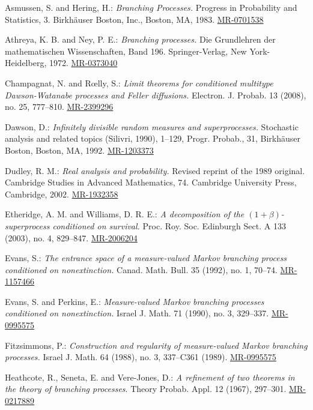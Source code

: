 \documentclass[12pt,a4paper]{amsart}
\numberwithin{equation}{section}
\theoremstyle{plain}
\theoremstyle{definition}
\theoremstyle{remark}
\def\MR#1{\href{http://www.ams.org/mathscinet-getitem?mr=#1}{MR-#1}}
\begin{document}
\begin{thebibliography}{99}

	Asmussen, S. and Hering, H.:
	\emph{Branching Processes.}
	Progress in Probability and Statistics, 3. Birkh\"auser Boston, Inc., Boston, MA, 1983.
	\MR{0701538}

	Athreya, K. B. and Ney, P. E.:
	\emph{Branching processes.}
	Die Grundlehren der mathematischen Wissenschaften, Band 196. Springer-Verlag, New York-Heidelberg, 1972.
	\MR{0373040}
	
	Champagnat, N. and R{\oe}lly, S.:
	\emph{Limit theorems for conditioned multitype Dawson-Watanabe processes and Feller diffusions.}
	Electron. J. Probab. 13 (2008), no. 25, 777--810.
	\MR{2399296}

	Dawson, D.:
	\emph{Infinitely divisible random measures and superprocesses.}
	Stochastic analysis and related topics (Silivri, 1990), 1--129, Progr. Probab., 31, Birkh\"auser Boston, Boston, MA, 1992.
	\MR{1203373}
	
	Dudley, R. M.:
	\emph{Real analysis and probability.}
	Revised reprint of the 1989 original. Cambridge Studies in Advanced Mathematics, 74. Cambridge University Press, Cambridge, 2002.
	\MR{1932358}
	
	Etheridge, A. M. and Williams, D. R. E.:
	\emph{A decomposition of the $(1+\beta)$-superprocess conditioned on survival.}
	Proc. Roy. Soc. Edinburgh Sect. A 133 (2003), no. 4, 829--847.
	\MR{2006204}
	
	Evans, S.:
	\emph{The entrance space of a measure-valued Markov branching process conditioned on nonextinction.}
	Canad. Math. Bull. 35 (1992), no. 1, 70--74.
	\MR{1157466} 
	
	Evans, S. and Perkins, E.:
	\emph{Measure-valued Markov branching processes conditioned on nonextinction.}
	Israel J. Math. 71 (1990), no. 3,
	329--337.
	\MR{0995575}
	
	Fitzsimmons, P.:
	\emph{Construction and regularity of measure-valued Markov branching processes.}
	Israel J. Math. 64 (1988), no. 3, 337--C361 (1989).
	\MR{0995575} 

	Heathcote, R.,  Seneta, E.  and Vere-Jones, D.:
	\emph{A refinement of two theorems in the theory of branching processes}.
	Theory Probab. Appl. 12 (1967), 297--301.
	\MR{0217889}


\end{thebibliography}
\end{document}
